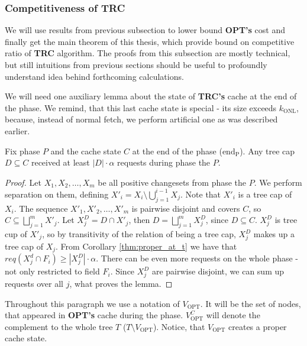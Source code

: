\subsubsection{Competitiveness of TRC} We will use results from
previous subsection to lower bound \textbf{OPT's} cost and finally get the main
theorem of this thesis, which provide bound on competitive ratio of \textbf{TRC}
algorithm. The proofs from this subsection are mostly technical, but still
intuitions from previous sections should be useful to profoundly understand idea
behind forthcoming calculations.

We will need one auxiliary lemma about the state of \textbf{TRC's} cache at the
end of the phase. We remind, that this last cache state is special - its size
exceeds $k_{\mathrm{ONL}}$, because, instead of normal fetch, we perform
artificial one as was described earlier.  \begin{lemma} Fix phase $P$ and the
cache state  $C$ at the end of the phase ($\mathrm{end_P}$). Any tree cap $D
\subseteq C$ received at least $|D| \cdot \alpha$ requests during phase the $P$.
\label{thm:lots_of_req_in_tc_end_of_p} \end{lemma} \begin{proof} Let $X_1, X_2,
\ldots, X_m$ be all positive changesets from phase the $P$.  We perform
separation on them, defining $X'_i = X_i \setminus \bigcup_{j=1}^{i-1} X_j$.
Note that $X'_i$ is a tree cap of $X_i$. The sequence $X'_1, X'_2, \ldots, X'_m$
is pairwise disjoint and covers $C$, so $C \subseteq \bigsqcup_{j=1}^m X'_j$.
Let $X_j^D = D \cap X'_j$, then $D = \bigsqcup_{j=1}^m X_j^D$, since $D
\subseteq C$. $X_j^D$ is tree cup of $X'_j$, so by transitivity of the relation
of being a tree cap, $X_j^D$ makes up a tree cap of $X_j$. From Corollary
\ref{thm:proper_at_t} we have that $req(X_j^d \cap F_i) \geq |X_j^D| \cdot
\alpha$. There can be even more requests on the whole phase - not only
restricted to field $F_i$. Since $X_j^D$ are pairwise disjoint, we can sum up
requests over all $j$, what proves the lemma.  \end{proof}


Throughout this paragraph we use a notation of $V_{\mathrm{OPT}}$. It will be
the set of nodes, that appeared in \textbf{OPT's} cache during the phase.
$V_{\mathrm{OPT}}^C$ will denote the complement to the whole tree $T$ ($T
\setminus V_{\mathrm{OPT}}$).  Notice, that $V_{\mathrm{OPT}}$ creates a proper
cache state.

